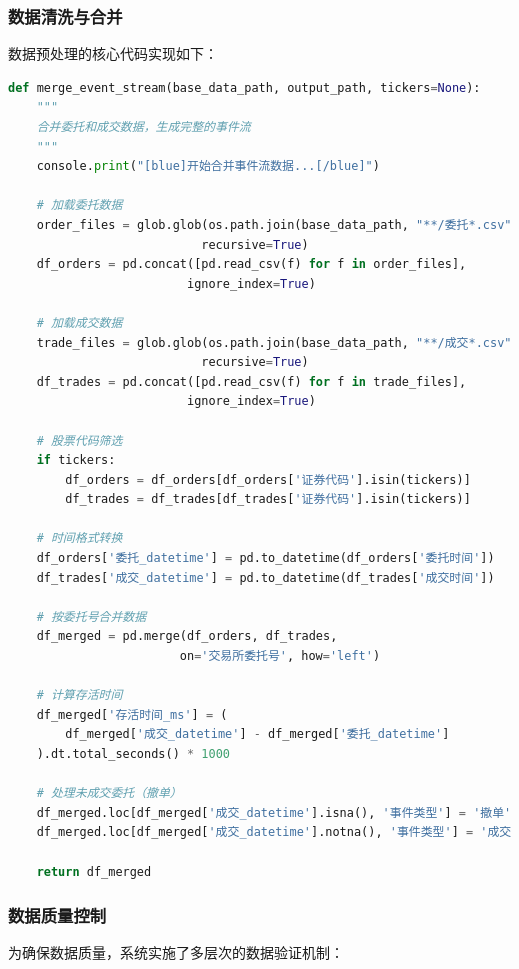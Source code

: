 \documentclass[12pt,a4paper]{article}
\begin{document}
\subsubsection{数据清洗与合并}

数据预处理的核心代码实现如下：

\begin{lstlisting}[language=Python, caption=数据合并核心代码]
def merge_event_stream(base_data_path, output_path, tickers=None):
    """
    合并委托和成交数据，生成完整的事件流
    """
    console.print("[blue]开始合并事件流数据...[/blue]")
    
    # 加载委托数据
    order_files = glob.glob(os.path.join(base_data_path, "**/委托*.csv"), 
                           recursive=True)
    df_orders = pd.concat([pd.read_csv(f) for f in order_files], 
                         ignore_index=True)
    
    # 加载成交数据
    trade_files = glob.glob(os.path.join(base_data_path, "**/成交*.csv"), 
                           recursive=True)
    df_trades = pd.concat([pd.read_csv(f) for f in trade_files], 
                         ignore_index=True)
    
    # 股票代码筛选
    if tickers:
        df_orders = df_orders[df_orders['证券代码'].isin(tickers)]
        df_trades = df_trades[df_trades['证券代码'].isin(tickers)]
    
    # 时间格式转换
    df_orders['委托_datetime'] = pd.to_datetime(df_orders['委托时间'])
    df_trades['成交_datetime'] = pd.to_datetime(df_trades['成交时间'])
    
    # 按委托号合并数据
    df_merged = pd.merge(df_orders, df_trades, 
                        on='交易所委托号', how='left')
    
    # 计算存活时间
    df_merged['存活时间_ms'] = (
        df_merged['成交_datetime'] - df_merged['委托_datetime']
    ).dt.total_seconds() * 1000
    
    # 处理未成交委托（撤单）
    df_merged.loc[df_merged['成交_datetime'].isna(), '事件类型'] = '撤单'
    df_merged.loc[df_merged['成交_datetime'].notna(), '事件类型'] = '成交'
    
    return df_merged
\end{lstlisting}

\subsubsection{数据质量控制}

为确保数据质量，系统实施了多层次的数据验证机制：
\end{document}
